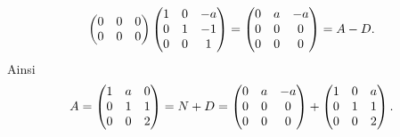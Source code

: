 {\begin{enumerate}
{$$\begin{pmatrix}
0&0&0\cr
0&0&0\cr
\end{pmatrix}\begin{pmatrix} 1&0&-a\cr
0&1&-1\cr
0&0&1\cr
\end{pmatrix}=\begin{pmatrix} 0&a&-a\cr
0&0&0\cr
0&0&0\cr
\end{pmatrix}=A-D.$$
Ainsi
$$A=\begin{pmatrix} 1&a&0\cr
0&1&1\cr
0&0&2\cr
\end{pmatrix}=N+D=\begin{pmatrix} 0&a&-a\cr
0&0&0\cr
0&0&0\cr
\end{pmatrix}+\begin{pmatrix} 1&0&a\cr
0&1&1\cr
0&0&2\cr
\end{pmatrix}.$$}
\end{enumerate}
}